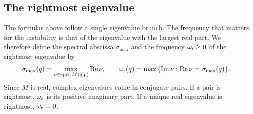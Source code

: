 \documentclass[11pt]{article}
\DeclareMathOperator{\RePart}{Re}
\begin{document}
\subsection{The rightmost eigenvalue}
The formulas above follow a single eigenvalue branch. The frequency that
matters for the instability is that of the eigenvalue with the largest real
part. We therefore define the spectral abscissa $\sigma_{\max}$ and the
frequency $\omega_{\rm r}\ge0$ of the rightmost eigenvalue by
\begin{equation}
 \sigma_{\max}(q)=\max_{\nu\in\operatorname{spec}M(q,p)}\RePart\nu,
 \qquad
 \omega_{\rm r}(q)=\max\left\{\operatorname{Im}\nu:
 \RePart\nu=\sigma_{\max}(q)\right\}.
 \label{eq:rightmost-frequency}
\end{equation}
Since $M$ is real, complex eigenvalues come in conjugate pairs. If a pair is
rightmost, $\omega_{\rm r}$ is its positive imaginary part. If a unique real
eigenvalue is rightmost, $\omega_{\rm r}=0$.


\end{document}
